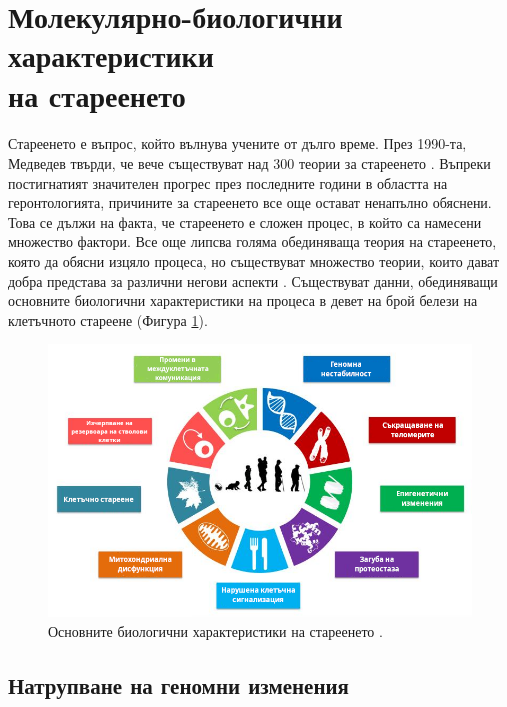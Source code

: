 \documentclass[pdftex,cyrillic,14pt,a4page,twoside,openright]{extreport}
\begin{document}
\section[Молекулярно-биологични характеристики на стареенето]{Молекулярно-биологични характеристики\\ на стареенето}
\paragraph{}
Стареенето е въпрос, който вълнува учените от дълго време. През 1990-та, Медведев твърди, че вече съществуват над 300 теории за стареенето \cite{medvedev1990}. Въпреки постигнатият значителен прогрес през последните години в областта на геронтологията, причините за стареенето все още остават ненапълно обяснени. Това се дължи на факта, че стареенето е сложен процес, в който са намесени множество фактори. Все още липсва голяма обединяваща теория на стареенето, която да обясни изцяло процеса, но съществуват множество теории, които дават добра представа за различни негови аспекти \cite{vina2007}. Съществуват данни, обединяващи основните биологични характеристики на процеса в девет на брой белези на клетъчното стареене (Фигура \ref{fig:biological_characteristics_of_aging}).

\begin{figure}[htp]
  \centering
  \includegraphics[width=14.1cm]{figures/biological_characteristics_of_aging}
  \caption {Основните биологични характеристики на стареенето \cite{lopezotin2013}.}
  \label{fig:biological_characteristics_of_aging}
\end{figure}

\subsection{Натрупване на геномни изменения}
\end{document}
